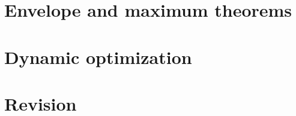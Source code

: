 \documentclass[letterpaper,10pt,english]{jupyterBook}
\begin{document}
\sphinxstepscope


\chapter{Envelope and maximum theorems}
\label{\detokenize{10.envelope_maximum:envelope-and-maximum-theorems}}\label{\detokenize{10.envelope_maximum::doc}}

\sphinxstepscope


\chapter{Dynamic optimization}
\label{\detokenize{11.dynamic:dynamic-optimization}}\label{\detokenize{11.dynamic::doc}}

\sphinxstepscope


\chapter{Revision}
\label{\detokenize{12.revision:revision}}\label{\detokenize{12.revision::doc}}







\renewcommand{\indexname}{Index}
\printindex
\end{document}
